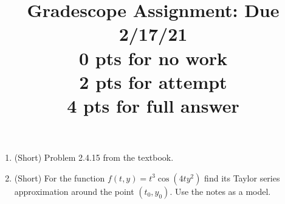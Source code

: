 \documentclass[a4paper,11pt]{article}
\title{Gradescope Assignment: Due 2/17/21\\
0 pts for no work\\ 2 pts for attempt\\ 4 pts for full answer}
\date{}
\begin{document}
\maketitle
\begin{enumerate}
\item (Short) Problem 2.4.15 from the textbook.
\item (Short) For the function $f(t,y)=t^{3}\cos(4ty^{2})$ find its Taylor series approximation around the point $(t_{0},y_{0})$.  Use the notes as a model.  
\end{enumerate}
\end{document}

